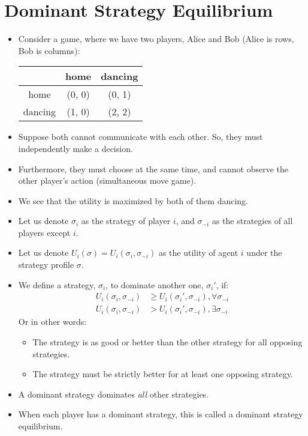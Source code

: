 \documentclass{article}
\begin{document}
\section{Dominant Strategy Equilibrium}
\begin{itemize}
    \item Consider a game, where we have two players, Alice and Bob (Alice is rows, Bob is columns):
        \begin{table}[h!]
            \centering
            \begin{tabular}{|c|c|c|}
            \hline
                & home   & dancing \\ \hline
        home    & (0, 0) & (0, 1)  \\ \hline
        dancing & (1, 0) & (2, 2)  \\ \hline
            \end{tabular}
        \end{table}
    \item Suppose both cannot communicate with each other.  So, they must independently make a decision.
    \item Furthermore, they must choose at the same time, and cannot observe the other player's action (simultaneous move game).
    \item We see that the utility is maximized by both of them dancing.
    \item Let us denote $\sigma_i$ as the strategy of player $i$, and $\sigma_{-i}$ as the strategies of all players except $i$.
    \item Let us denote $U_i(\sigma) = U_i(\sigma_i, \sigma_{-i})$ as the utility of agent $i$ under the strategy profile $\sigma$.
    \item We define a strategy, $\sigma_i$, to dominate another one, $\sigma_i'$, if:
        \begin{align*}
            U_i(\sigma_i, \sigma_{-i}) &\geq U_i(\sigma_i', \sigma_{-i}), \forall \sigma_{-i}\\
            U_i(\sigma_i, \sigma_{-i}) &> U_i(\sigma_i', \sigma_{-i}), \exists \sigma_{-i}
        \end{align*}
        Or in other words:
        \begin{itemize}
            \item The strategy is as good or better than the other strategy for all opposing strategies.
            \item The strategy must be strictly better for at least one opposing strategy.
        \end{itemize}
    \item A dominant strategy dominates \emph{all} other strategies.
    \item When each player has a dominant strategy, this is called a dominant strategy equilibrium.
\end{itemize}
\end{document}
